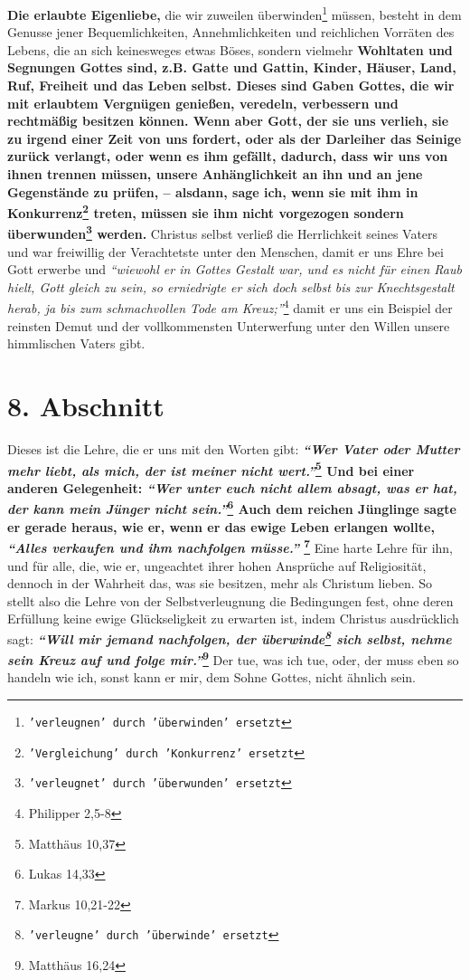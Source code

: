 \label{ref:04_07_vorteile}
\textbf{Die erlaubte Eigenliebe,} die wir zuweilen
überwinden\footnote{\texttt{'verleugnen' durch 'überwinden' ersetzt}} müssen,
besteht in dem
Genusse jener Bequemlichkeiten, Annehmlichkeiten und reichlichen Vorräten des
Lebens, die an sich keinesweges etwas Böses, sondern vielmehr \textbf{Wohltaten
und
Segnungen Gottes sind, z.B. Gatte und Gattin, Kinder, Häuser, Land, Ruf,
Freiheit und das Leben selbst. Dieses sind Gaben Gottes, die wir mit erlaubtem
Vergnügen genießen, veredeln, verbessern und rechtmäßig besitzen können. Wenn
aber Gott, der sie uns verlieh, sie zu irgend einer Zeit von uns fordert, oder
als der Darleiher das Seinige zurück verlangt, oder wenn es ihm gefällt,
dadurch, dass wir uns von ihnen trennen müssen, unsere Anhänglichkeit an ihn und
an jene Gegenstände zu prüfen, -- alsdann, sage ich, wenn sie mit ihm in
Konkurrenz\footnote{\texttt{'Vergleichung' durch 'Konkurrenz' ersetzt}} treten,
müssen
sie ihm nicht vorgezogen sondern überwunden\footnote{\texttt{'verleugnet' durch
'überwunden' ersetzt}} werden.}
Christus selbst verließ die Herrlichkeit seines Vaters und war freiwillig der
Verachtetste unter den Menschen, damit er uns Ehre bei Gott erwerbe und
\textit{"`wiewohl er in Gottes Gestalt war, und es nicht für einen Raub hielt,
Gott
gleich zu sein, so erniedrigte er sich doch selbst bis zur Knechtsgestalt
herab, ja bis zum schmachvollen Tode am Kreuz;"'}\footnote{Philipper 2,5-8}
damit er
uns ein Beispiel der reinsten Demut und der vollkommensten Unterwerfung unter
den Willen unsere himmlischen Vaters gibt.

\section{8. Abschnitt} \label{kap4_ab8}

Dieses ist die Lehre, die er uns mit den Worten gibt:
\textbf{
\textit{"`Wer Vater oder Mutter mehr liebt, als mich, der ist meiner nicht
wert."'}\footnote{Matthäus  10,37}
Und bei einer anderen Gelegenheit:
\textit{"`Wer unter euch nicht allem absagt, was er hat, der kann mein Jünger
nicht sein."'}\footnote{Lukas 14,33} Auch dem reichen
Jünglinge sagte er gerade heraus, wie er, wenn er das ewige Leben erlangen
wollte,
\textit{"`Alles verkaufen und ihm nachfolgen müsse."'}
\footnote{Markus 10,21-22}
}
Eine harte Lehre für ihn, und für alle, die, wie er, ungeachtet ihrer hohen
Ansprüche auf Religiosität, dennoch in der Wahrheit das, was sie besitzen, mehr
als Christum lieben. So stellt also die Lehre von der Selbstverleugnung die
Bedingungen fest, ohne deren Erfüllung keine ewige Glückseligkeit zu erwarten
ist, indem Christus ausdrücklich sagt:
\textbf{
\textit{"`Will mir jemand nachfolgen, der überwinde\footnote{\texttt{'verleugne'
durch 'überwinde' ersetzt}} sich selbst, nehme sein Kreuz auf und folge
mir."'}\footnote{Matthäus 16,24}}
Der tue, was ich tue, oder, der muss eben so handeln wie ich, sonst kann
er mir, dem Sohne Gottes, nicht ähnlich sein.

